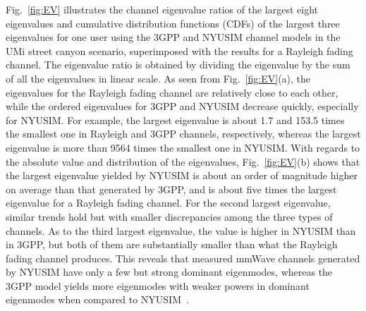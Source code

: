 \documentclass[journal]{IEEEtran}
\begin{document}
Fig.~\ref{fig:EV} illustrates the channel eigenvalue ratios of the largest eight eigenvalues and cumulative distribution functions (CDFs) of the largest three eigenvalues for one user using the 3GPP and NYUSIM channel models in the UMi street canyon scenario, superimposed with the results for a Rayleigh fading channel. The eigenvalue ratio is obtained by dividing the eigenvalue by the sum of all the eigenvalues in linear scale. As seen from Fig.~\ref{fig:EV}(a), the eigenvalues for the Rayleigh fading channel are relatively close to each other, while the ordered eigenvalues for 3GPP and NYUSIM decrease quickly, especially for NYUSIM. For example, the largest eigenvalue is about 1.7 and 153.5 times the smallest one in Rayleigh and 3GPP channels, respectively, whereas the largest eigenvalue is more than 9564 times the smallest one in NYUSIM. With regards to the absolute value and distribution of the eigenvalues, Fig.~\ref{fig:EV}(b) shows that the largest eigenvalue yielded by NYUSIM is about an order of magnitude higher on average than that generated by 3GPP, and is about five times the largest eigenvalue for a Rayleigh fading channel. For the second largest eigenvalue, similar trends hold but with smaller discrepancies among the three types of channels. As to the third largest eigenvalue, the value is higher in NYUSIM than in 3GPP, but both of them are substantially smaller than what the Rayleigh fading channel produces. This reveals that measured mmWave channels generated by NYUSIM have only a few but strong dominant eigenmodes, whereas the 3GPP model yields more eigenmodes with weaker powers in dominant eigenmodes when compared to NYUSIM~\cite{Rap_5GTech}.
\end{document}
